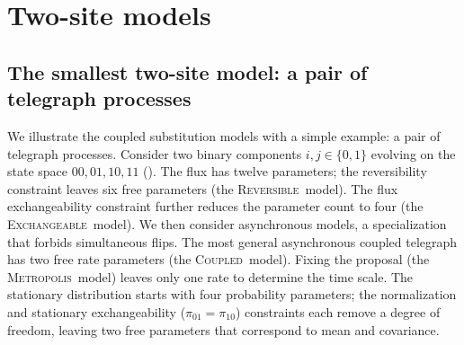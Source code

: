 \documentclass{article}
\newcommand{\Reversible}{\textsc{Reversible}}
\newcommand{\Coupledm}{\textsc{Coupled}}
\newcommand{\Exchm}{\textsc{Exchangeable}}
\newcommand{\Metrop}{\textsc{Metropolis}}
\begin{document}

\section{Two-site models}
\label{sec:pair}
\subsection{The smallest two-site model: a pair of telegraph processes}
\label{sec:pairbinary}
We illustrate the coupled substitution models with a simple example: a pair of telegraph processes.
Consider two binary components $i,j\in\{0,1\}$ evolving on the state space $00,01,10,11$ ().
The flux has twelve parameters; the reversibility constraint leaves six free parameters (the \Reversible\ model).
The flux exchangeability constraint further reduces the parameter count to four (the \Exchm\ model).
We then consider asynchronous models, a specialization that forbids simultaneous flips.
The most general asynchronous coupled telegraph has two free rate parameters (the \Coupledm\ model). 
Fixing the proposal (the \Metrop\ model) leaves only one rate to determine the time scale.
The stationary distribution starts with four probability parameters; the normalization and stationary exchangeability ($\pi_{01} = \pi_{10}$) constraints each remove a degree of freedom, leaving two free parameters that correspond to mean and covariance.
\end{document}
